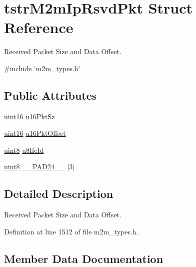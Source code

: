 \hypertarget{structtstrM2mIpRsvdPkt}{}\section{tstr\+M2m\+Ip\+Rsvd\+Pkt Struct Reference}
\label{structtstrM2mIpRsvdPkt}


Received Packet Size and Data Offset.  




{\ttfamily \#include \char`\"{}m2m\+\_\+types.\+h\char`\"{}}

\subsection*{Public Attributes}
\begin{DoxyCompactItemize}
\item 
\hyperlink{group__DataT_ga1daa745171fc6e31d942c161422a76f9}{uint16} \hyperlink{structtstrM2mIpRsvdPkt_a382bb08e219a5310706cabb5c73042a6}{u16\+Pkt\+Sz}
\item 
\hyperlink{group__DataT_ga1daa745171fc6e31d942c161422a76f9}{uint16} \hyperlink{structtstrM2mIpRsvdPkt_af7ca067246d6e1072f2f083197cefa63}{u16\+Pkt\+Offset}
\item 
\hyperlink{group__DataT_ga4df709a77647e870bbf1d955b8edc9a6}{uint8} \hyperlink{structtstrM2mIpRsvdPkt_a99e019aded6ee09bd86bb1d0bfdebead}{u8\+Ifc\+Id}
\item 
\hyperlink{group__DataT_ga4df709a77647e870bbf1d955b8edc9a6}{uint8} \hyperlink{structtstrM2mIpRsvdPkt_a8a75648078f9b05d1fe2711b04543ab2}{\+\_\+\+\_\+\+P\+A\+D24\+\_\+\+\_\+} \mbox{[}3\mbox{]}
\end{DoxyCompactItemize}


\subsection{Detailed Description}
Received Packet Size and Data Offset. 

Definition at line 1512 of file m2m\+\_\+types.\+h.



\subsection{Member Data Documentation}
\mbox{\label{structtstrM2mIpRsvdPkt_a8a75648078f9b05d1fe2711b04543ab2}} 
